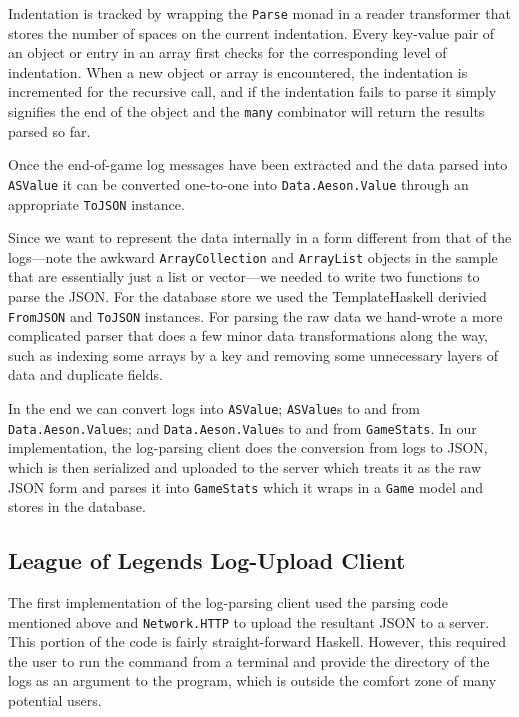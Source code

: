 \documentclass[letterpaper,twocolumn,9pt]{article}
\newcommand{\code}[1]{\texttt{#1}}
\begin{document}
Indentation is tracked by wrapping the \code{Parse} monad in a reader transformer that stores the number of spaces on the current indentation.  Every key-value pair of an object or entry in an array first checks for the corresponding level of indentation.  When a new object or array is encountered, the indentation is incremented for the recursive call, and if the indentation fails to parse it simply signifies the end of the object and the \code{many} combinator will return the results parsed so far.

Once the end-of-game log messages have been extracted and the data parsed into \code{ASValue} it can be converted one-to-one into \code{Data.Aeson.Value} through an appropriate \code{ToJSON} instance.

Since we want to represent the data internally in a form different from that of the logs---note the awkward \code{ArrayCollection} and \code{ArrayList} objects in the sample that are essentially just a list or vector---we needed to write two functions to parse the JSON.  For the database store we used the TemplateHaskell derivied \code{FromJSON} and \code{ToJSON} instances.  For parsing the raw data we hand-wrote a more complicated parser that does a few minor data transformations along the way, such as indexing some arrays by a key and removing some unnecessary layers of data and duplicate fields.

In the end we can convert logs into \code{ASValue}; \code{ASValue}s to and from \code{Data.Aeson.Value}s; and \code{Data.Aeson.Value}s to and from \code{GameStats}.  In our implementation, the log-parsing client does the conversion from logs to JSON, which is then serialized and uploaded to the server which treats it as the raw JSON form and parses it into \code{GameStats} which it wraps in a \code{Game} model and stores in the database.

\subsection{League of Legends Log-Upload Client}

The first implementation of the log-parsing client used the parsing code mentioned above and \code{Network.HTTP} to upload the resultant JSON to a server.  This portion of the code is fairly straight-forward Haskell.  However, this required the user to run the command from a terminal and provide the directory of the logs as an argument to the program, which is outside the comfort zone of many potential users.
\end{document}
